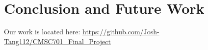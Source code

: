 \section{Conclusion and Future Work}

Our work is located here:
\url{https://github.com/Josh-Tang112/CMSC701_Final_Project}

